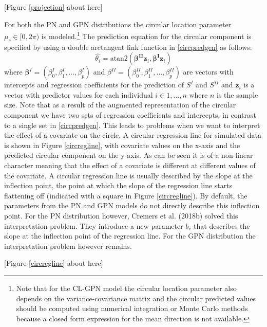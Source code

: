 \documentclass[man,mask]{apa6}
\let\rmarkdownfootnote\footnote%
\def\footnote{\protect\rmarkdownfootnote}
\begin{document}
\hfil \hspace{2cm} {[}Figure \ref{projection} about here{]} \hfil

\indent For both the PN and GPN distributions the circular location parameter
\(\mu_c\in [0, 2\pi)\) is modeled.\footnote{Note that for the CL-GPN
model the circular location parameter also depends on the variance-covariance
matrix and the circular predicted values should be computed using numerical
integration or Monte Carlo methods because a closed form expression for the mean
direction is not available.} The prediction equation for the circular component is specified by using a double arctangent link function in \eqref{circpredgen} as follows:
\begin{equation}\label{circpredCLPNCLGPN}
\hat{\theta_i} = \text{atan2}(\boldsymbol{\beta^{II}}\boldsymbol{z}_i, \boldsymbol{\beta^{I}}\boldsymbol{z}_i)
\end{equation}
\noindent where \(\boldsymbol{\beta}^{I} = (\beta_0^{I}, \beta_1^{I}, \dots, \beta_p^{I})\) and
\(\beta^{II} = (\beta_0^{II}, \beta_1^{II}, \dots, \beta_p^{II})\) are vectors with
intercepts and regression coefficients for the prediction of \(S^{I}\) and
\(S^{II}\) and \(\boldsymbol{z}_i\) is a vector with predictor values for each
individual \(i \in 1, \dots, n\) where \(n\) is the sample size. Note that as a
result of the augmented representation of the circular component we have two sets
of regression coefficients and intercepts, in contrast to a single set in
\eqref{circpredgen}. This leads to problems when we want to interpret the effect
of a covariate on the circle. A circular regression line for simulated data is shown in Figure
\ref{circregline}, with covariate values on the x-axis and the predicted
circular component on the y-axis. As can be seen it is of a non-linear character
meaning that the effect of a covariate is different at different values of the
covariate. A circular regression line is usually described by the slope at the
inflection point, the point at which the slope of the regression line starts
flattening off (indicated with a square in Figure \ref{circregline}). By
default, the parameters from the PN and GPN models do not directly describe this
inflection point. For the PN distribution however, Cremers et al. (2018b)
solved this interpretation problem. They introduce a new parameter \(b_c\) that describes the slope at
the inflection point of the regression line. For the GPN distribution the
interpretation problem however remains.

\hfil \hspace{2cm} {[}Figure \ref{circregline} about here{]} \hfil
\end{document}
